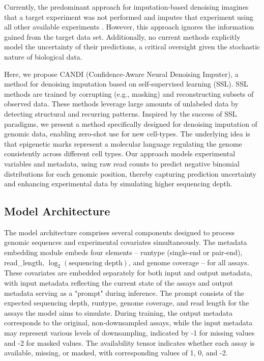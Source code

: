 \documentclass[twoside,11pt]{article}
\begin{document}
{Currently, the predominant approach for imputation-based denoising imagines that a target experiment was not performed and imputes that experiment using all other available experiments \cite{ernst2015large}. 
However, this approach ignores the information gained from the target data set.
Additionally, 
no current methods explicitly model the uncertainty of their predictions, a critical oversight given the stochastic nature of biological data.

Here, we propose CANDI (Confidence-Aware Neural Denoising Imputer), a method for denoising imputation based on self-supervised learning (SSL). 
SSL methods are trained by corrupting (e.g., masking) and reconstructing subsets of observed data. These methods leverage large amounts of unlabeled data by detecting structural and recurring patterns. Inspired by the success of SSL paradigms, we present a method specifically designed for denoising imputation of genomic data, enabling zero-shot use for new cell-types. The underlying idea is that epigenetic marks represent a molecular language regulating the genome consistently across different cell types. Our approach models experimental variables and metadata, using raw read counts to predict negative binomial distributions for each genomic position, thereby capturing prediction uncertainty and enhancing experimental data by simulating higher sequencing depth.
}

\subsection{Model Architecture}

The model architecture comprises several components designed to process  genomic sequences and experimental covariates simultaneously. The metadata embedding module embeds four elements -- runtype (single-end or pair-end), read\_length, $\log_{2} (\text{sequencing depth})$, and genome coverage -- for all assays. These covariates are embedded separately for both input and output metadata, with input metadata reflecting the current state of the assays and output metadata serving as a "prompt" during inference. The prompt consists of the expected sequencing depth, runtype, genome coverage, and read length for the assays the model aims to simulate. During training, the output metadata corresponds to the original, non-downsampled assays, while the input metadata may represent various levels of downsampling, indicated by -1 for missing values and -2 for masked values. The availability tensor indicates whether each assay is available, missing, or masked, with corresponding values of 1, 0, and -2.
\end{document}
